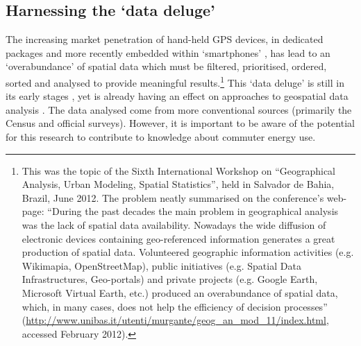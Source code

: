 \documentclass[a4paper, 11pt, twoside]{Thesis}
\begin{document}
\subsection{Harnessing the `data deluge'}
The increasing market penetration of hand-held GPS devices, in dedicated
packages \citep{Oliver2010} and more recently embedded within `smartphones'
\citep{Gong2011}, has lead to an `overabundance' of spatial data which must be
filtered, prioritised, ordered, sorted and analysed to provide meaningful
results.\footnote{
This was the topic of
the Sixth International Workshop on ``Geographical Analysis,
Urban Modeling, Spatial Statistics'', held in Salvador de Bahia, Brazil,
June 2012. The problem neatly summarised on the conference's web-page:
``During the past decades the main problem in geographical
analysis was the lack of spatial data availability. Nowadays the wide diffusion
of electronic devices containing geo-referenced information generates a great
production of spatial data. Volunteered geographic information activities (e.g.
Wikimapia, OpenStreetMap), public initiatives (e.g. Spatial Data
Infrastructures, Geo-portals) and private projects (e.g. Google Earth, Microsoft
Virtual Earth, etc.) produced an overabundance of spatial data, which, in many
cases, does not help the efficiency of decision
processes''
(\url{http://www.unibas.it/utenti/murgante/geog_an_mod_11/index.html}, accessed
February 2012).
}
This `data deluge' is still in its early stages \citep{Bell2009}, yet is
already having an effect on approaches to geospatial data analysis
\citep{Jiang2011}. The data analysed come from more
conventional sources (primarily the Census and official surveys). However, it is
important to be aware of the potential for this research to contribute to
knowledge about commuter energy use.
\end{document}
